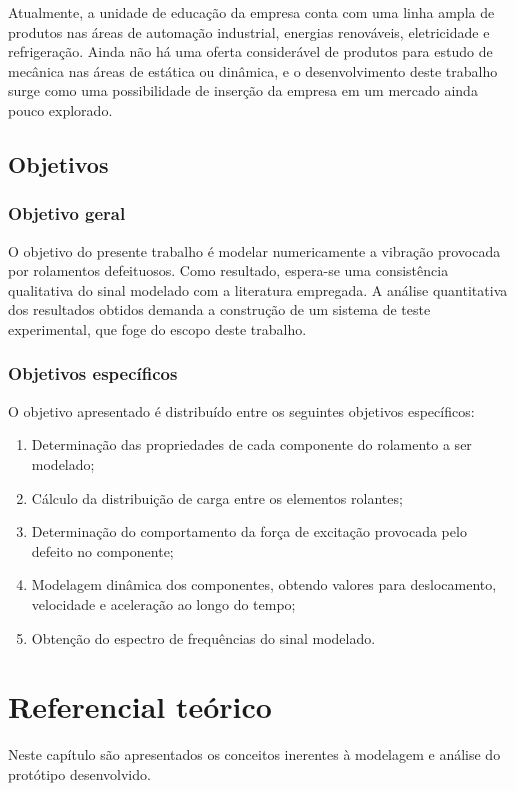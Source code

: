 \documentclass[12pt,oneside,english,brazil,lmodern,siglas,simbolos,cite=num]{ucsmonograph}
\begin{document}
	Atualmente, a unidade de educação da empresa conta com uma linha ampla de produtos nas áreas de automação industrial, energias renováveis, eletricidade e refrigeração.
	Ainda não há uma oferta considerável de produtos para estudo de mecânica nas áreas de estática ou dinâmica, e o desenvolvimento deste trabalho surge como uma possibilidade de inserção da empresa em um mercado ainda pouco explorado.
	
	\section{Objetivos}
	
	\subsection{Objetivo geral}
	O objetivo do presente trabalho é modelar numericamente a vibração provocada por rolamentos defeituosos.
	Como resultado, espera-se uma consistência qualitativa do sinal modelado com a literatura empregada.
	A análise quantitativa dos resultados obtidos demanda a construção de um sistema de teste experimental, que foge do escopo deste trabalho.
	
	\subsection{Objetivos específicos} \label{sec:objetivos:especificos}
	O objetivo apresentado é distribuído entre os seguintes objetivos específicos:
	\begin{enumerate}
		\item Determinação das propriedades de cada componente do rolamento a ser modelado;
		\item Cálculo da distribuição de carga entre os elementos rolantes;
		\item Determinação do comportamento da força de excitação provocada pelo defeito no componente;
		\item Modelagem dinâmica dos componentes, obtendo valores para deslocamento, velocidade e aceleração ao longo do tempo;
		\item Obtenção do espectro de frequências do sinal modelado.
	\end{enumerate}

	\chapter{Referencial teórico}
	Neste capítulo são apresentados os conceitos inerentes à modelagem e análise do protótipo desenvolvido.
	
\end{document}
